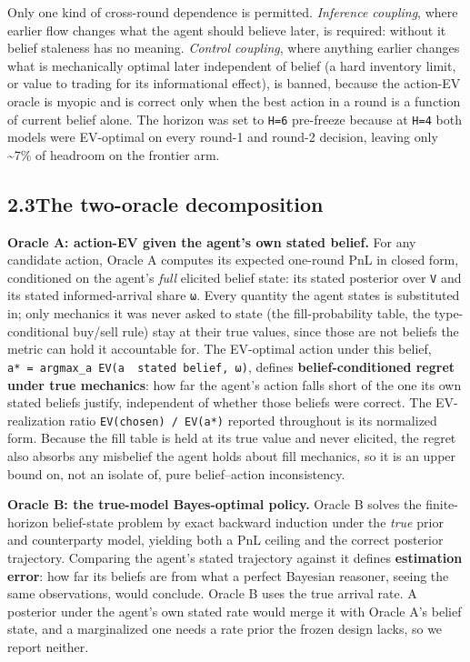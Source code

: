 \documentclass[
  10pt,
]{article}
\begin{document}
Only one kind of cross-round dependence is permitted. \emph{Inference coupling}, where earlier flow changes what the agent should believe later, is required: without it belief staleness has no meaning. \emph{Control coupling}, where anything earlier changes what is mechanically optimal later independent of belief (a hard inventory limit, or value to trading for its informational effect), is banned, because the action-EV oracle is myopic and is correct only when the best action in a round is a function of current belief alone. The horizon was set to \texttt{H=6} pre-freeze because at \texttt{H=4} both models were EV-optimal on every round-1 and round-2 decision, leaving only \textasciitilde7\% of headroom on the frontier arm.

\subsection{2.3\quad The two-oracle decomposition}\label{the-two-oracle-decomposition}

\textbf{Oracle A: action-EV given the agent's own stated belief.} For any candidate action, Oracle A computes its expected one-round PnL in closed form, conditioned on the agent's \emph{full} elicited belief state: its stated posterior over \texttt{V} and its stated informed-arrival share \texttt{ω}. Every quantity the agent states is substituted in; only mechanics it was never asked to state (the fill-probability table, the type-conditional buy/sell rule) stay at their true values, since those are not beliefs the metric can hold it accountable for. The EV-optimal action under this belief, \texttt{a*\ =\ argmax\_a\ EV(a\ \textbar{}\ stated\ belief,\ ω)}, defines \textbf{belief-conditioned regret under true mechanics}: how far the agent's action falls short of the one its own stated beliefs justify, independent of whether those beliefs were correct. The EV-realization ratio \texttt{EV(chosen)\ /\ EV(a*)} reported throughout is its normalized form. Because the fill table is held at its true value and never elicited, the regret also absorbs any misbelief the agent holds about fill mechanics, so it is an upper bound on, not an isolate of, pure belief--action inconsistency.

\textbf{Oracle B: the true-model Bayes-optimal policy.} Oracle B solves the finite-horizon belief-state problem by exact backward induction under the \emph{true} prior and counterparty model, yielding both a PnL ceiling and the correct posterior trajectory. Comparing the agent's stated trajectory against it defines \textbf{estimation error}: how far its beliefs are from what a perfect Bayesian reasoner, seeing the same observations, would conclude. Oracle B uses the true arrival rate. A posterior under the agent's own stated rate would merge it with Oracle A's belief state, and a marginalized one needs a rate prior the frozen design lacks, so we report neither.
\end{document}
